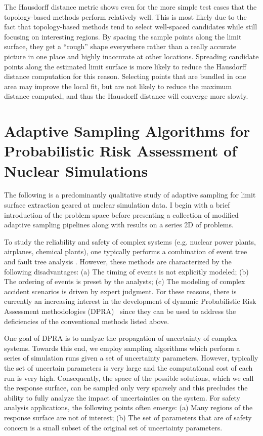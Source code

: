 The Hausdorff distance metric shows even for the more simple test cases that the topology-based methods perform relatively well.
%
This is most likely due to the fact that topology-based methods tend to select well-spaced candidates while still focusing on interesting regions.
%
By spacing the sample points along the limit surface, they get a ``rough'' shape everywhere rather than a really accurate picture in one place and highly inaccurate at other locations.
%
Spreading candidate points along the estimated limit surface is more likely to reduce the Hausdorff distance computation for this reason.
%
Selecting points that are bundled in one area may improve the local fit, but are not likely to reduce the maximum distance computed, and thus the Hausdorff distance will converge more slowly.



\section{Adaptive Sampling Algorithms for Probabilistic Risk Assessment of Nuclear Simulations}
\label{paper:psa}

The following is a predominantly qualitative study of adaptive sampling for limit surface extraction geared at nuclear simulation data.
%
I begin with a brief introduction of the problem space before presenting a collection of modified adaptive sampling pipelines along with results on a series 2D of problems.

To study the reliability and safety of complex systems (e.g. nuclear power plants, airplanes, chemical plants), one typically performs a combination of event tree and fault tree analysis \cite{Zio2009}.
%
However, these methods are characterized by the following disadvantages: (a) The timing of events is not explicitly modeled; (b) The ordering of events is preset by the analysts; (c) The modeling of complex accident scenarios is driven by expert judgment.
%
For these reasons, there is currently an increasing interest in the development of dynamic Probabilistic Risk Assessment methodologies (DPRA)~\cite{Siu1994} since they can be used to address the deficiencies of the conventional methods listed above.

One goal of DPRA is to analyze the propagation of uncertainty of complex systems.
%
Towards this end, we employ sampling algorithms which perform a series of simulation runs given a set of uncertainty parameters.
%
However, typically the set of uncertain parameters is very large and the computational cost of each run is very high.
%
Consequently, the space of the possible solutions, which we call the response surface, can be sampled only very sparsely and this precludes the ability to fully analyze the impact of uncertainties on the system.
%
For safety analysis applications, the following points often emerge: (a) Many regions of the response surface are not of interest; (b) The set of parameters that are of safety concern is a small subset of the original set of uncertainty parameters.

